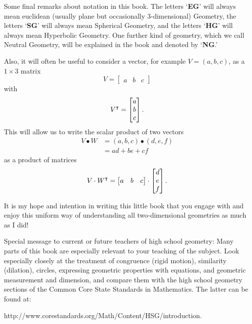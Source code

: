 \documentclass{ximera}
\begin{document}
Some final remarks about notation in this book. The letters `\textbf{EG}' will
always mean euclidean (usually plane but occasionally $3$-dimensional)
Geometry, the letters `\textbf{SG}' will always mean Spherical Geometry, and
the letters `\textbf{HG}' will always mean Hyperbolic Geometry. One further
kind of geometry, which we call Neutral Geometry, will be explained in the
book and denoted by `\textbf{NG}.'

Also, it will often be useful to consider a vector, for example
$V=\left(a,b,c\right)$, as a $1\times3$ matrix
\[
V=
\begin{bmatrix}
a & b & c
\end{bmatrix}
\]
with
\[
V^\intercal  =
\begin{bmatrix}
a\\
b\\
c
\end{bmatrix}.
\]
This will allow us to write the scalar product of two vectors%
\begin{align*}
V\bullet W  &  =\left(  a,b,c\right)  \bullet\left(d,e,f\right) \\
&  =ad+be+cf%
\end{align*}
as a product of matrices%
\[
V\cdot W^\intercal=
\begin{bmatrix}
a & b & c
\end{bmatrix} 
\cdot
\begin{bmatrix}
d\\
e\\
f
\end{bmatrix}.
\]


It is my hope and intention in writing this little book that you engage with
and enjoy this uniform way of understanding all two-dimensional geometries as
much as I did!

\begin{remark}
Special message to current or future teachers of high school geometry:
Many parts of this book are especially relevant to your teaching of
the subject. Look especially closely at the treatment of congruence
(rigid motion), similarity (dilation), circles, expressing geometric
properties with equations, and geometric measurement and dimension,
and compare them with the high school geometry sections of the Common
Core State Standards in Mathematics. The latter can be found at:
\end{remark}

\begin{center}
http://www.corestandards.org/Math/Content/HSG/introduction.
\end{center}
\end{document}
